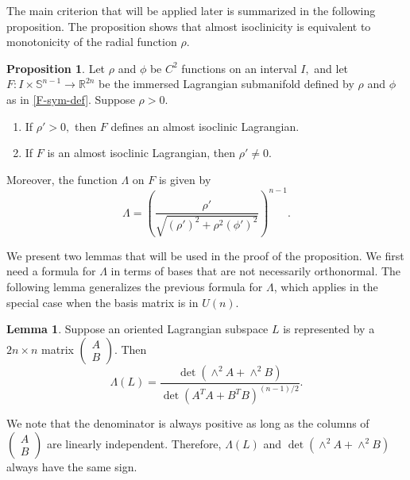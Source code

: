 \documentclass[11pt]{amsart}
\numberwithin{equation}{section}
\theoremstyle{definition}
\theoremstyle{definition}
\newtheorem{prop}[equation]{Proposition} %
\newtheorem{lemma}[equation]{Lemma}
\newcommand{\pr}[1]{\left(#1\right)}
\newcommand{\bb}[1]{\mathbb{#1}} \newcommand{\td}[1]{\widetilde{#1}}
\begin{document}
The main criterion that will be applied later is summarized in the following proposition.
The proposition shows that almost isoclinicity is equivalent to monotonicity of the radial function $\rho.$

\begin{prop}
	\label{prop:AI-sym}
	Let $\rho$ and $\phi$ be $C^2$ functions on an interval $I,$ and let $F\colon I\times \mathbb S^{n-1}\to\bb R^{2n}$ be the immersed Lagrangian submanifold defined by $\rho$ and $\phi$ as in \eqref{F-sym-def}.
	Suppose $\rho>0.$
	\begin{enumerate}
		\item \label{AI-sym-1}
		If $\rho'>0,$ then $F$ defines an almost isoclinic Lagrangian.
		\item \label{AI-sym-2}
		If $F$ is an almost isoclinic Lagrangian, then $\rho'\neq 0.$
	\end{enumerate}
    Moreover, the function $\Lambda$ on $F$ is given by
    \begin{equation}\label{Lambda-formula-sym}
    \Lambda
    = \pr{\frac{\rho'}{\sqrt{\pr{\rho'}^2 + \rho^2\pr{\phi'}^2}}}^{n-1}.
    \end{equation}
\end{prop}


We present two lemmas that will be used in the proof of the proposition.
We first need a formula for $\Lambda$ in terms of bases that are not necessarily orthonormal. The following lemma generalizes the previous formula for $\Lambda$, which applies in the special case when the basis matrix is in ${U}(n)$.

\begin{lemma}\label{Lambda_general}
Suppose an oriented Lagrangian subspace $L$ is represented by a $2n\times n$ matrix
$
\begin{pmatrix}
A\\B
\end{pmatrix}.
$
Then
\[
\Lambda(L)
=
\frac{
\det\!\left(\wedge^2 A+\wedge^2 B\right)
}{
\det\!\left(A^TA + B^TB\right)^{(n-1)/2}
}.
\]
\end{lemma}

We note that the denominator is always positive as long as the columns of $
\begin{pmatrix}
A\\B
\end{pmatrix}
$ are linearly independent. 
Therefore, $\Lambda(L)$ and $\det\!\left(\wedge^2 A+\wedge^2 B\right)$ always have the same sign. 
\end{document}
